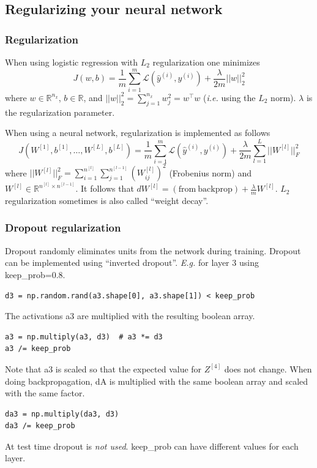 \documentclass{article}
\begin{document}
\subsection{Regularizing your neural network}
\subsubsection{Regularization}
When using logistic regression with $L_2$ regularization one minimizes
\begin{equation}
  J(w,b)=\frac{1}{m}\sum_{i=1}^m\mathcal{L}(\hat{y}^{(i)},y^{(i)})+\frac{\lambda}{2m}||w||_2^2
\end{equation}
where $w\in\mathbb{R}^{n_x}$, $b\in\mathbb{R}$, and $||w||_2^2=\sum_{j=1}^{n_x}w_j^2=w^\top w$
(\emph{i.e.} using the $L_2$ norm).
$\lambda$ is the regularization parameter.

When using a neural network, regularization is implemented as follows
\begin{equation}
  J(W^{[1]},b^{[1]},\ldots,W^{[L]},b^{[L]})=\frac{1}{m}\sum_{i=1}^m\mathcal{L}(\hat{y}^{(i)},y^{(i)})
  +\frac{\lambda}{2m}\sum_{l=1}^L||W^{[l]}||_F^2
\end{equation}
where $||W^{[l]}||_F^2=\sum_{i=1}^{n^{[l]}}\sum_{j=1}^{n^{[l-1]}}(W^{[l]}_{ij})^2$ (Frobenius norm) and
$W^{[l]}\in\mathbb{R}^{n^{[l]}\times n^{[l-1]}}$.
It follows that $dW^{[l]}=(\mathrm{from\ backprop})+\frac{\lambda}{m}W^{[l]}$.
$L_2$ regularization sometimes is also called ``weight decay''.

\subsubsection{Dropout regularization}
Dropout randomly eliminates units from the network during training.
Dropout can be implemented using ``inverted dropout''.
\emph{E.g.} for layer 3 using keep\_prob=0.8.
\begin{verbatim}
d3 = np.random.rand(a3.shape[0], a3.shape[1]) < keep_prob
\end{verbatim}
The activations a3 are multiplied with the resulting boolean array.
\begin{verbatim}
a3 = np.multiply(a3, d3)  # a3 *= d3
a3 /= keep_prob
\end{verbatim}
Note that a3 is scaled so that the expected value for $Z^{[4]}$ does not change.
When doing backpropagation, dA is multiplied with the same boolean array and scaled with the same factor.
\begin{verbatim}
da3 = np.multiply(da3, d3)
da3 /= keep_prob
\end{verbatim}
At test time dropout is \emph{not used}.
keep\_prob can have different values for each layer.
\end{document}

